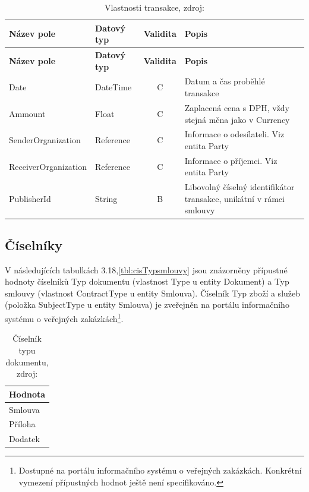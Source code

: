 \begin{center}
\begin{longtable}{lp{20mm}cp{65mm}}
\label{grid_mlmmh} \\
\multicolumn{1}{l}{\textbf{Název pole}} & 
\multicolumn{1}{l}{\textbf{Datový typ}} & 
\multicolumn{1}{l}{\textbf{Validita}} & 
\multicolumn{1}{l}{\textbf{Popis}} \\ \hline 
\endfirsthead
\multicolumn{1}{l}{\textbf{Název pole}} & 
\multicolumn{1}{l}{\textbf{Datový typ}} & 
\multicolumn{1}{l}{\textbf{Validita}} & 
\multicolumn{1}{l}{\textbf{Popis}} \\ \hline 
\hline
\endhead
\endfoot
\caption[Vlastnosti transakce]{Vlastnosti transakce, zdroj:\cite{metodika, standard}}
\endlastfoot
\rowcolor{validateC}Date & DateTime & C & Datum a čas proběhlé transakce \\
\rowcolor{validateC}Ammount & Float & C & Zaplacená cena s DPH, vždy stejná měna jako v Currency \\
\rowcolor{validateC}SenderOrganization & Reference & C & Informace o odesílateli. Viz entita Party \\
\rowcolor{validateC}ReceiverOrganization & Reference & C & Informace o příjemci. Viz entita Party \\
\rowcolor{validateB}PublisherId & String & B & Libovolný číselný identifikátor transakce, unikátní v rámci smlouvy \\
\end{longtable}
\end{center}

\newpage

\subsection{Číselníky}

V následujících tabulkách 3.18,\ref{tbl:cisTypsmlouvy} jsou znázorněny přípustné hodnoty číselníků Typ dokumentu (vlastnost Type u entity Dokument) a Typ smlouvy (vlastnost ContractType u entity Smlouva). Číselník Typ zboží a služeb (položka SubjectType u entity Smlouva) je zveřejněn na portálu informačního systému o veřejných zakázkách\footnote{Dostupné na portálu informačního systému o veřejných zakázkách\cite{isvz}. Konkrétní vymezení přípustných hodnot ještě není specifikováno.}.

\begin{table}[h]
\centering
\begin{tabular}{l}
\label{tbl:cisTypDokumentu} \\
\textbf{Hodnota} \\
\hline
\rowcolor{validateB}Smlouva \\
\rowcolor{validateB}Příloha \\
\rowcolor{validateB}Dodatek \\
\end{tabular}
\caption[Číselník typu dokumentu]{Číselník typu dokumentu, zdroj:\cite{metodika, standard}}
\end{table}

